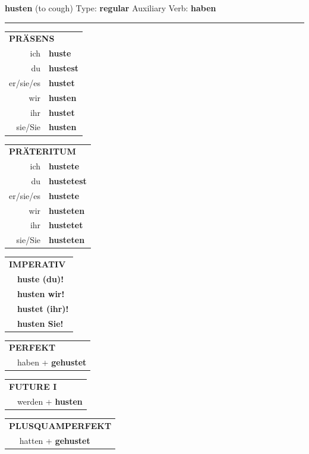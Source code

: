 \documentclass[10pt,a4paper]{revtex4-2}
\begin{document}
\begin{verbbox}
{\Large \bf husten} (to cough) \hfill Type: \textbf{regular} \hfill Auxiliary Verb: \textbf{haben}

\vspace{5pt}
\hrule
\vspace{5pt}

\begin{tabular}{rl}
\multicolumn{2}{l}{\textbf{PRÄSENS}}\\
ich & \textbf{huste}\\
du & \textbf{hustest}\\
er/sie/es & \textbf{hustet}\\
wir & \textbf{husten}\\
ihr & \textbf{hustet}\\
sie/Sie & \textbf{husten}\\
\end{tabular}
\hfill
\begin{tabular}{rl}
\multicolumn{2}{l}{\textbf{PRÄTERITUM}}\\
ich & \textbf{hustete}\\
du & \textbf{hustetest}\\
er/sie/es & \textbf{hustete}\\
wir & \textbf{husteten}\\
ihr & \textbf{hustetet}\\
sie/Sie & \textbf{husteten}\\
\end{tabular}
\hfill
\begin{tabular}{rl}
\multicolumn{2}{l}{\textbf{IMPERATIV}}\\
& \textbf{huste (du)!}\\
& \textbf{husten wir!}\\
& \textbf{hustet (ihr)!}\\
& \textbf{husten Sie!}\\
\end{tabular}

\vspace{10pt}

\begin{tabular}{rl}
\multicolumn{2}{l}{\textbf{PERFEKT}}\\
& haben + \textbf{gehustet}\\
\end{tabular}
\hfill
\begin{tabular}{rl}
\multicolumn{2}{l}{\textbf{FUTURE I}}\\
& werden + \textbf{husten}\\
\end{tabular}
\hfill
\begin{tabular}{rl}
\multicolumn{2}{l}{\textbf{PLUSQUAMPERFEKT}}\\
& hatten + \textbf{gehustet}\\
\end{tabular}


\end{verbbox}
\end{document}
